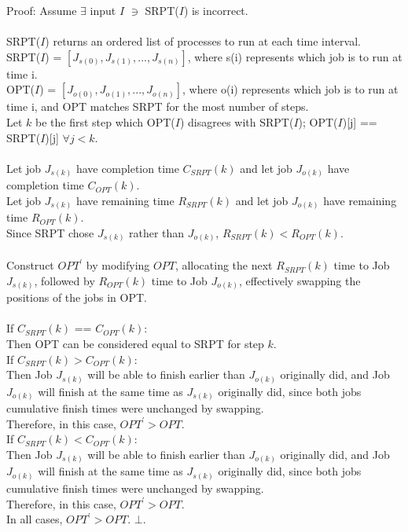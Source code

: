 \documentclass[10pt]{article}
\begin{document}
	Proof: Assume $\exists$ input $I$ $\ni$ SRPT($I$) is incorrect.\\
	\\
	SRPT($I$) returns an ordered list of processes to run at each time interval.\\
	SRPT($I$) = $[J_{s(0)}, J_{s(1)}, ..., J_{s(n)}]$, where s(i) represents which job is to run at time i.\\
	OPT($I$)  = $[J_{o(0)}, J_{o(1)}, ..., J_{o(n)}]$, where o(i) represents which job is to run at time i, and OPT matches SRPT for the most number of steps.\\
	Let $k$ be the first step which OPT($I$) disagrees with SRPT($I$); OPT($I$)[j] == SRPT($I$)[j] $\forall j < k$.\\
	\\
	Let job $J_{s(k)}$ have completion time $C_{SRPT}(k)$ and let job $J_{o(k)}$ have completion time $C_{OPT}(k)$.\\
	Let job $J_{s(k)}$ have remaining time $R_{SRPT}(k)$ and let job $J_{o(k)}$ have remaining time $R_{OPT}(k)$.\\
	Since SRPT chose $J_{s(k)}$ rather than $J_{o(k)}$, $R_{SRPT}(k) < R_{OPT}(k)$.\\
	\\
	Construct $OPT^{\prime}$ by modifying $OPT$, allocating the next $R_{SRPT}(k)$ time to Job $J_{s(k)}$,
	followed by $R_{OPT}(k)$ time to Job $J_{o(k)}$, effectively swapping the positions of the jobs in OPT.\\
	\\
	
	If $C_{SRPT}(k)$ == $C_{OPT}(k)$:\\
	Then OPT can be considered equal to SRPT for step $k$.\\
	
	If $C_{SRPT}(k) > C_{OPT}(k)$:\\
	Then Job $J_{s(k)}$ will be able to finish earlier than $J_{o(k)}$ originally did,
	and Job $J_{o(k)}$ will finish at the same time as $J_{s(k)}$ originally did,
	since both jobs cumulative finish times were unchanged by swapping.\\
	Therefore, in this case, $OPT^\prime > OPT$.\\
	
	If $C_{SRPT}(k) < C_{OPT}(k)$:\\
	Then Job $J_{s(k)}$ will be able to finish earlier than $J_{o(k)}$ originally did,
	and Job $J_{o(k)}$ will finish at the same time as $J_{s(k)}$ originally did,
	since both jobs cumulative finish times were unchanged by swapping.\\
	Therefore, in this case, $OPT^\prime > OPT$.\\
	
	In all cases, $OPT^\prime > OPT$. $\bot$.\\
	
\end{document}
